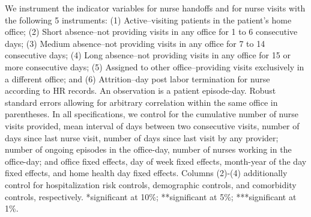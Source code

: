 \documentclass[final,12pt, notitlepage]{article}
\begin{document}
\begin{singlespace}
\begin{table}[H]
\begin{threeparttable}
\begin{tablenotes}
	We instrument the indicator variables for nurse handoffs and for nurse visits with the following 5 instruments:
(1) Active--visiting patients in the patient's home office;
(2) Short absence--not providing visits in any office for 1 to 6 consecutive days;
(3) Medium absence--not providing visits in any office for 7 to 14 consecutive days;
(4) Long absence--not providing visits in any office for 15 or more consecutive days;
(5) Assigned to other office--providing visits exclusively in a different office; and
(6) Attrition--day post labor termination for nurse according to HR records.
	An observation is a patient episode-day.
	Robust standard errors allowing for arbitrary correlation within the same office in parentheses.
		In all specifications, we control for the cumulative number of nurse visits provided, mean interval of days between two consecutive visits, number of days since last nurse visit, number of days since last visit by any provider; number of ongoing episodes in the office-day, number of nurses working in the office-day; and office fixed effects, day of week fixed effects, month-year of the day fixed effects, and home health day fixed effects.
	Columns (2)-(4) additionally control for hospitalization risk controls, demographic controls, and comorbidity controls, respectively.
	*significant at 10\%; **significant at 5\%; ***significant at 1\%.

	\end{tablenotes}
\end{threeparttable}
\end{table}





\end{singlespace}
\end{document}
